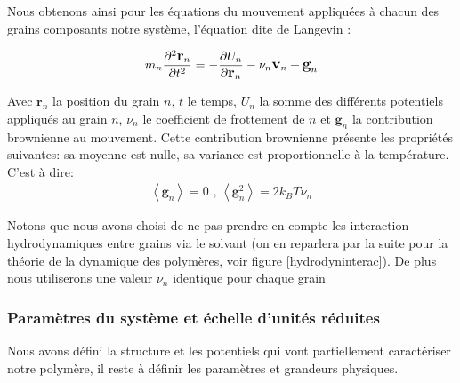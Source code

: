 Nous obtenons ainsi pour les équations du mouvement appliquées à chacun des grains composants notre système, l'équation dite de Langevin \cite{Lemons1997} :

\begin{eqnarray}
\large{
m_n \frac{\partial^2 \textbf{r}_n}{\partial t^2} = -\frac{\partial U_{n}}{\partial \textbf{r}_n} - \nu_n \textbf{v}_n   + \textbf{g}_n}
\label{langevin}
\end{eqnarray}



Avec $\textbf{r}_n$ la position du grain $n$, $t$ le temps, $U_{n}$ la somme des différents potentiels appliqués au grain $n$, $\nu_n$ le coefficient de frottement de $n$ et $\textbf{g}_n$ la contribution brownienne au mouvement. Cette contribution brownienne présente les propriétés suivantes: sa moyenne est nulle, sa variance est proportionnelle à la température. C'est à dire:
\begin{eqnarray}
\left<\textbf{g}_n\right>\text{}=\text{} 0\text{ , } \left<\textbf{g}_n^2\right>\text{}=\text{} 2 k_B T\nu_n
\end{eqnarray}

 Notons que nous avons choisi de ne pas prendre en compte les interaction hydrodynamiques entre grains via le solvant (on en reparlera par la suite pour la théorie de la dynamique des polymères, voir figure \ref{hydrodyninterac}). De plus nous utiliserons une valeur $\nu_n$ identique pour chaque grain \\


\subsubsection{Paramètres du système et échelle d'unités réduites}

Nous avons défini la structure et les potentiels qui vont partiellement caractériser notre polymère, il reste à définir les paramètres et grandeurs physiques.

